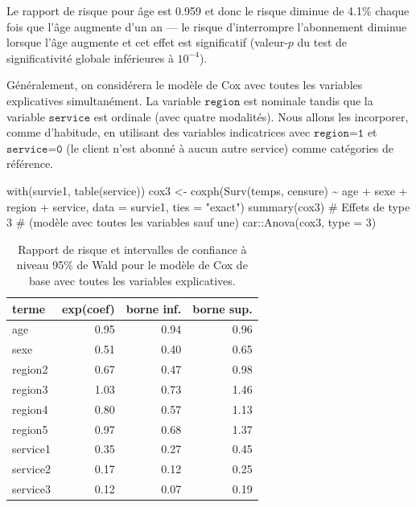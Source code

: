 \documentclass[
  11pt,
  letterpaper,
]{scrbook}
\newenvironment{Shaded}{\begin{snugshade}}{\end{snugshade}}
\newcommand{\AttributeTok}[1]{\textcolor[rgb]{0.40,0.45,0.13}{#1}}
\newcommand{\CommentTok}[1]{\textcolor[rgb]{0.37,0.37,0.37}{#1}}
\newcommand{\DecValTok}[1]{\textcolor[rgb]{0.68,0.00,0.00}{#1}}
\newcommand{\FunctionTok}[1]{\textcolor[rgb]{0.28,0.35,0.67}{#1}}
\newcommand{\NormalTok}[1]{\textcolor[rgb]{0.00,0.23,0.31}{#1}}
\newcommand{\OtherTok}[1]{\textcolor[rgb]{0.00,0.23,0.31}{#1}}
\newcommand{\SpecialCharTok}[1]{\textcolor[rgb]{0.37,0.37,0.37}{#1}}
\newcommand{\StringTok}[1]{\textcolor[rgb]{0.13,0.47,0.30}{#1}}
\theoremstyle{definition}
\theoremstyle{remark}
\begin{document}
Le rapport de risque pour âge est 0.959 et donc le risque diminue de
4.1\% chaque fois que l'âge augmente d'un an --- le risque d'interrompre
l'abonnement diminue lorsque l'âge augmente et cet effet est
significatif (valeur-\(p\) du test de significativité globale
inférieures à \(10^{-4}\)).

Généralement, on considérera le modèle de Cox avec toutes les variables
explicatives simultanément. La variable \(\texttt{region}\) est nominale
tandis que la variable \(\texttt{service}\) est ordinale (avec quatre
modalités). Nous allons les incorporer, comme d'habitude, en utilisant
des variables indicatrices avec \(\texttt{region=1}\) et
\(\texttt{service=0}\) (le client n'est abonné à aucun autre service)
comme catégories de référence.

\begin{Shaded}
\begin{Highlighting}[]
\FunctionTok{with}\NormalTok{(survie1, }\FunctionTok{table}\NormalTok{(service))}
\NormalTok{cox3 }\OtherTok{\textless{}{-}} \FunctionTok{coxph}\NormalTok{(}\FunctionTok{Surv}\NormalTok{(temps, censure) }\SpecialCharTok{\textasciitilde{}} 
\NormalTok{                age }\SpecialCharTok{+}\NormalTok{ sexe }\SpecialCharTok{+}\NormalTok{ region }\SpecialCharTok{+}\NormalTok{ service, }
              \AttributeTok{data =}\NormalTok{ survie1, }
              \AttributeTok{ties =} \StringTok{"exact"}\NormalTok{)}
\FunctionTok{summary}\NormalTok{(cox3)}
\CommentTok{\# Effets de type 3 }
\CommentTok{\# (modèle avec toutes les variables sauf une)}
\NormalTok{car}\SpecialCharTok{::}\FunctionTok{Anova}\NormalTok{(cox3, }
           \AttributeTok{type =} \DecValTok{3}\NormalTok{)}
\end{Highlighting}
\end{Shaded}

\hypertarget{tbl-survie5-coefs}{}
\begin{table}
\caption{\label{tbl-survie5-coefs}Rapport de risque et intervalles de confiance à niveau 95\% de Wald pour
le modèle de Cox de base avec toutes les variables explicatives. }\tabularnewline

\centering
\begin{tabular}{lrrr}
\toprule
terme & exp(coef) & borne inf. & borne sup.\\
\midrule
age & 0.95 & 0.94 & 0.96\\
sexe & 0.51 & 0.40 & 0.65\\
region2 & 0.67 & 0.47 & 0.98\\
region3 & 1.03 & 0.73 & 1.46\\
region4 & 0.80 & 0.57 & 1.13\\
\addlinespace
region5 & 0.97 & 0.68 & 1.37\\
service1 & 0.35 & 0.27 & 0.45\\
service2 & 0.17 & 0.12 & 0.25\\
service3 & 0.12 & 0.07 & 0.19\\
\bottomrule
\end{tabular}
\end{table}
\end{document}
